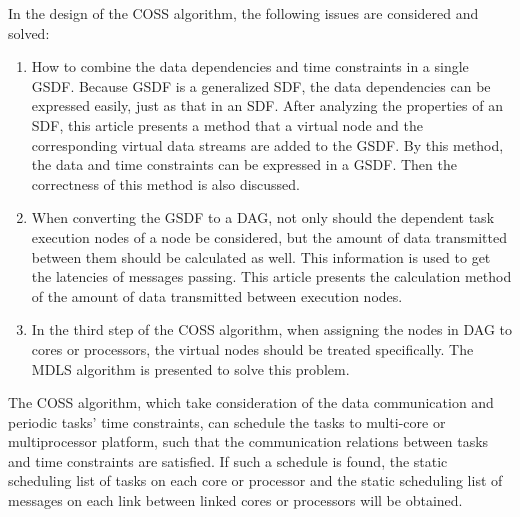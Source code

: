 \begin{eabstract}
In the design of the COSS algorithm, the following issues are considered and solved:
\begin{enumerate}
    \item How to combine the data dependencies and time constraints in a single GSDF. Because GSDF is a generalized SDF, the data dependencies can be expressed easily, just as that in an SDF. After analyzing the properties of an SDF, this article presents a method that a virtual node and the corresponding virtual data streams are added to the GSDF. By this method, the data and time constraints can be expressed in a GSDF. Then the correctness of this method is also discussed.
    \item When converting the GSDF to a DAG, not only should the dependent task execution nodes of a node be considered, but the amount of data transmitted between them should be calculated as well. This information is used to get the latencies of messages passing. This article presents the calculation method of the amount of data transmitted between execution nodes.
    \item In the third step of the COSS algorithm, when assigning the nodes in DAG to cores or processors, the virtual nodes should be treated specifically. The MDLS algorithm is presented to solve this problem.
\end{enumerate}


 The COSS algorithm, which take consideration of the data communication and periodic tasks' time constraints, can schedule the tasks to multi-core or multiprocessor platform, such that the communication relations between tasks and time constraints are satisfied. If such a schedule is found, the static scheduling list of tasks on each core or processor and the static scheduling list of messages on each link between linked cores or processors will be obtained.

\end{eabstract}
